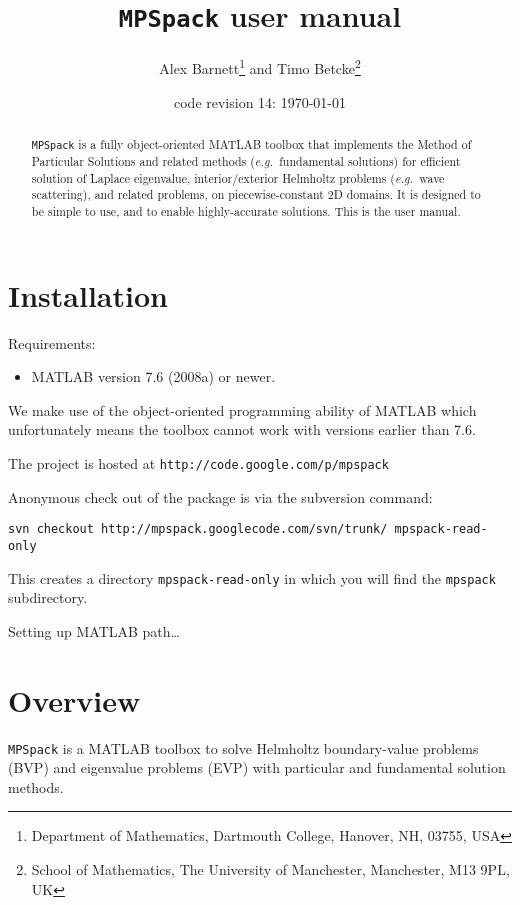 \documentclass[12pt]{article}
\newcommand{\bi}{\begin{itemize}}
\newcommand{\ei}{\end{itemize}}
\newcommand{\eg}{{\it e.g.\ }}
\begin{document}
\title{{\tt MPSpack} user manual}
\author{Alex Barnett\footnote{Department of Mathematics, Dartmouth College, Hanover, NH, 03755, USA}
and Timo Betcke\footnote{School
of Mathematics, The University of Manchester,
  Manchester, M13 9PL, UK}}
\date{code revision 14: \today}

\maketitle
\begin{abstract}
{\tt MPSpack} is a fully object-oriented MATLAB toolbox that implements the Method of Particular Solutions and related methods (\eg fundamental solutions) for efficient solution of Laplace eigenvalue, interior/exterior Helmholtz problems (\eg wave scattering), and related problems, on piecewise-constant 2D domains.
It is designed to be simple to use, and to enable highly-accurate solutions.
This is the user manual.
\end{abstract}

\section{Installation}

Requirements:
\bi
\item MATLAB version 7.6 (2008a) or newer.
\ei

We make use of the object-oriented programming ability of MATLAB which
unfortunately means the toolbox cannot work with versions earlier than 7.6.


The project is hosted at
{\tt http://code.google.com/p/mpspack}


Anonymous check out of the package is via the subversion command:

{\tt svn checkout http://mpspack.googlecode.com/svn/trunk/ mpspack-read-only}

This creates a directory {\tt mpspack-read-only} in which you will find
the {\tt mpspack} subdirectory.



Setting up MATLAB path\ldots


\section{Overview}

{\tt MPSpack} is a MATLAB toolbox to solve Helmholtz boundary-value
problems (BVP) and
eigenvalue problems (EVP) with particular and fundamental solution methods.
\end{document}
